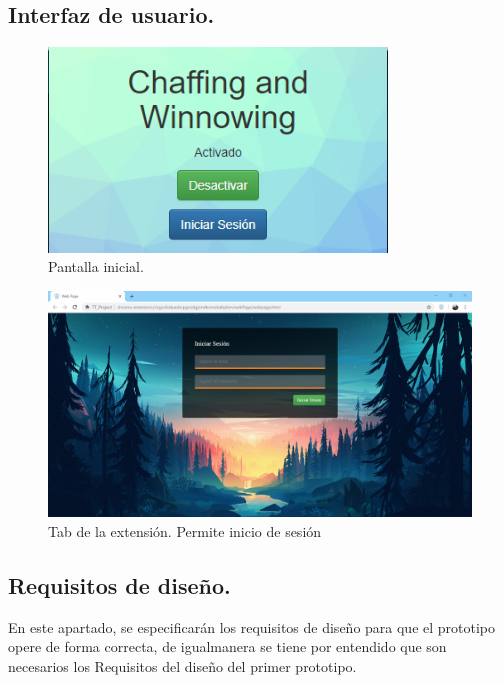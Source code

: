 \documentclass[12pt, a4paper, titlepage]{report}
\begin{document}
		\subsection{Interfaz de usuario.}

		    \begin{figure}[H]
				\begin{center}	\includegraphics[width=9cm]{./imagenes/Desarrollo/Prototipo_2/UI_inicio.PNG}
					\caption{Pantalla inicial.}
				\end{center}
			\end{figure}
			  
		    \begin{figure}[H]
				\begin{center}	\includegraphics[width=15cm]{./imagenes/Desarrollo/Prototipo_2/UI_webpage.png}
					\caption{Tab de la extensión. Permite inicio de sesión}
				\end{center}
			\end{figure}
			
	    \subsection{Requisitos de diseño.}
			   En este apartado, se especificarán los requisitos de diseño para que el prototipo opere de forma correcta, de igualmanera se tiene por entendido que son necesarios los Requisitos del diseño del primer prototipo.
\end{document}
